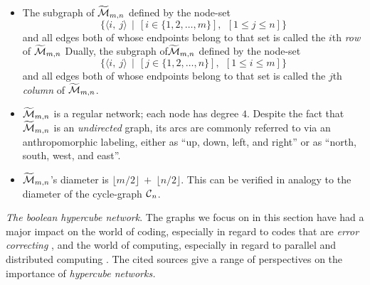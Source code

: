 \begin{itemize}
  \begin{itemize}
  \item
The subgraph of $\widetilde{\mbox{$\cal M$}}_{m,n}$ defined by the node-set
\[ \{ \langle i, \ j \rangle  \ \ | \ \ \left[i \in \{1, 2, \ldots,
  m\}\right], \ \ \left[1 \leq j \leq n\right]\}
\]
and all edges both of whose endpoints belong to that set is called the
$i$th {\it row} of $\widetilde{\mbox{$\cal M$}}_{m,n}$
Dually, the subgraph of$\widetilde{\mbox{$\cal M$}}_{m,n}$ defined by the node-set
\[ \{ \langle i, \ j \rangle  \ \ | \ \ \left[j \in \{1, 2, \ldots,
  n\}\right], \ \ \left[1 \leq i \leq m\right] \}
\]
and all edges both of whose endpoints belong to that set is called the
$j$th {\it column} of $\widetilde{\mbox{$\cal M$}}_{m,n}$.
  \item
$\widetilde{\mbox{$\cal M$}}_{m,n}$ is a regular network; each node has degree $4$.
    Despite the fact that $\widetilde{\mbox{$\cal M$}}_{m,n}$ is an {\em
      undirected} graph, its arcs are commonly referred to via an
    anthropomorphic labeling, either as ``up, down, left, and right''
    or as ``north, south, west, and east''.
  \item {}
$\widetilde{\mbox{$\cal M$}}_{m,n}$'s diameter is $\lfloor m/2 \rfloor \ + \
\lfloor n/2 \rfloor$.  This can be verified in analogy to the diameter
of the cycle-graph $\mbox{$\cal C$}_n$.
  \end{itemize}
\end{itemize}

\bigskip

{\it The boolean hypercube network}.
%
The graphs we focus on in this section have had a major impact on the
world of coding, especially in regard to codes that are {\em error
  correcting} \cite{PetersonW81}, and the world of computing,
especially in regard to parallel and distributed computing
\cite{JohnssonH1989, SaadS89, Schwartz80}.  The cited sources give a
range of perspectives on the importance of {\it hypercube networks.}

